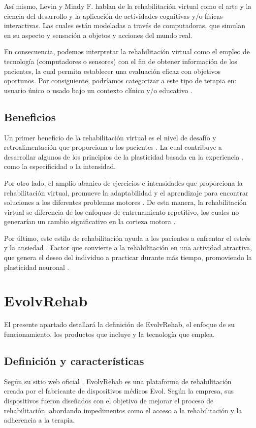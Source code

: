 \documentclass[journal]{IEEEtran}
\begin{document}
Así mismo, Levin y Mindy F. \cite{levin2020potential} hablan de la rehabilitación virtual como el arte y la ciencia del desarrollo y la aplicación de actividades cognitivas y/o físicas interactivas. Las cuales están modeladas a través de computadoras, que simulan en su aspecto y sensación a objetos y acciones del mundo real. 

En consecuencia, podemos interpretar la rehabilitación virtual como el empleo de tecnología (computadores o sensores) con el fin de obtener información de los pacientes, la cual permita establecer una evaluación eficaz con objetivos oportunos. Por consiguiente, podríamos categorizar a este tipo de terapia en: usuario único o usado bajo un contexto clínico y/o educativo \cite{weiss2009moving}.


\subsection{Beneficios}
Un primer beneficio de la rehabilitación virtual es el nivel de desafío y retroalimentación que proporciona a los pacientes \cite{levin2020potential}. La cual contribuye a desarrollar algunos de los principios de la plasticidad basada en la experiencia \cite{kleim2008principles}, como la especificidad o la intensidad.

Por otro lado, el amplio abanico de ejercicios e intensidades que proporciona la rehabilitación virtual, promueve la adaptabilidad y el aprendizaje para encontrar soluciones a los diferentes problemas motores \cite{levin2020potential}. De esta manera, la rehabilitación virtual se diferencia de los enfoques de entrenamiento repetitivo, los cuales no generarían un cambio significativo en la corteza motora \cite{levin2020potential, nudo2013recovery}.

Por último, este estilo de rehabilitación ayuda a los pacientes a enfrentar el estrés y la ansiedad \cite{dolatabadi2017toronto}. Factor que convierte a la rehabilitación en una actividad atractiva, que genera el deseo del individuo a practicar durante más tiempo, promoviendo la plasticidad neuronal \cite{levin2020potential}. 

\section{EvolvRehab}
El presente apartado detallará la definición de EvolvRehab, el enfoque de su funcionamiento, los productos que incluye y la tecnología que emplea. 

\subsection{Definición y características}
Según su sitio web oficial \cite{evolvRehab}, EvolvRehab es una plataforma de rehabilitación creada por el fabricante de dispositivos médicos Evol. Según la empresa, sus dispositivos fueron diseñados con el objetivo de mejorar el proceso de rehabilitación, abordando impedimentos como el acceso a la rehabilitación y la adherencia a la terapia.
\end{document}
